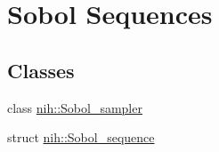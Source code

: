 \hypertarget{group__sobol}{
\section{\-Sobol \-Sequences}
\label{group__sobol}
}
\subsection*{\-Classes}
\begin{DoxyCompactItemize}
\item 
class \hyperlink{classnih_1_1_sobol__sampler}{nih\-::\-Sobol\-\_\-sampler}
\item 
struct \hyperlink{structnih_1_1_sobol__sequence}{nih\-::\-Sobol\-\_\-sequence}
\end{DoxyCompactItemize}
